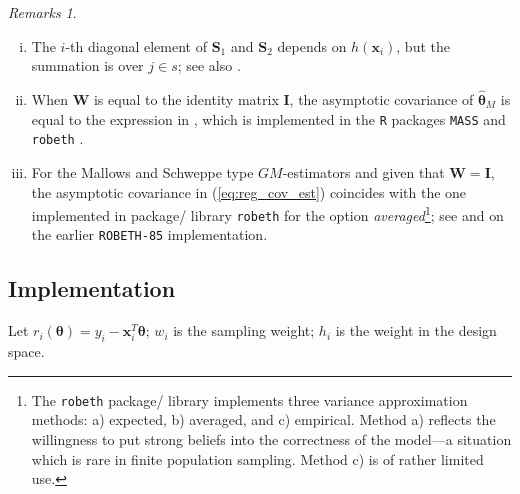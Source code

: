 \documentclass[a4paper,oneside,11pt,DIV=12]{scrartcl}
\newcommand{\code}[1]{{\texttt{#1}}}    %
\theoremstyle{remark}
\newtheorem*{remarks}{Remarks}
\begin{document}
\begin{remarks}~
\vspace{-0.5em}
\begin{enumerate}[i)]
    \item  The $i$-th diagonal element of $\bm S_1$ and $\bm S_2$ depends on $h(\bm x_i)$, but the summation is over $j \in s$; see also \citet[][Chap. 6]{marazzi_1987}.
    \item When $\bm W$ is equal to the identity matrix $\bm I$, the asymptotic covariance of $\widehat{\bm \theta}_M$ is equal to the expression in \citet[][Eq. 6.5]{huber_1981}, which is implemented in the \code{R} packages \code{MASS} \citep[][see function \code{rlm}]{venables_ripley_2002} and \code{robeth} \citep[][see subroutine \code{KFFACV}]{marazzi_2020}.
    \item For the Mallows and Schweppe type $GM$-estimators and given that $\bm W = \bm I$, the asymptotic covariance in (\ref{eq:reg_cov_est}) coincides with the one implemented in package/ library \code{robeth} for the option   \textit{averaged}\footnote{The \code{robeth} package/ library implements three variance approximation methods: a) expected, b) averaged, and c) empirical. Method a) reflects the willingness to put strong beliefs into the correctness of the model---a situation which is rare in finite population sampling. Method c) is of rather limited use.}; see \citet[][Chap. 4]{marazzi_1993} and \citet[][Chap. 2.6]{marazzi_1987} on the earlier \code{ROBETH-85} implementation.
\end{enumerate}
\end{remarks}






\subsection{Implementation}


Let $r_i(\bm \theta) = y_i - \bm x_i^T \bm \theta$; $w_i$ is the sampling weight; $h_i$ is the weight in the design space.
\end{document}
